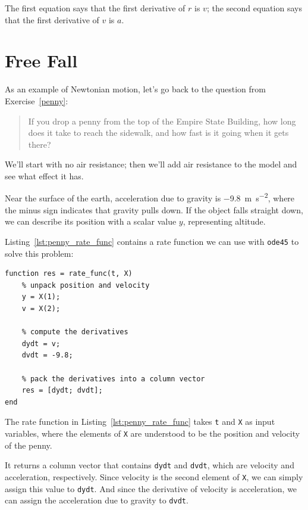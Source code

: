 The first equation says that the first derivative of $r$ is $v$;
the second equation says that the first derivative of $v$ is $a$.


\section{Free Fall}
\label{freefall}

As an example of Newtonian motion, let's go back to the question from Exercise~\ref{penny}:

\begin{quote}
If you drop a penny from the top of the Empire State Building, how long does it take to reach the sidewalk, and how fast is it going when it gets there?
\end{quote}

We'll start with no air resistance; then we'll add air resistance to the model and see what effect it has.


Near the surface of the earth,
acceleration due to gravity is \SI{-9.8}{\meter \per \second \squared}, where the minus sign
indicates that gravity pulls down.
If the object falls straight down, we can describe its position with a
scalar value $y$, representing altitude.

Listing~\ref{lst:penny_rate_func} contains a rate function we can use with \lstinline{ode45} to solve
this problem:

\begin{lstlisting}[caption={A rate function for the falling penny problem}, label={lst:penny_rate_func}]
function res = rate_func(t, X)
    % unpack position and velocity
    y = X(1);
    v = X(2);

    % compute the derivatives
    dydt = v;
    dvdt = -9.8;

    % pack the derivatives into a column vector
    res = [dydt; dvdt];
end
\end{lstlisting}

The rate function in Listing~\ref{lst:penny_rate_func} takes \lstinline{t} and \lstinline{X} as input variables, where the elements of \lstinline{X} are understood to be the position and velocity of the penny.

It returns a column vector that contains \lstinline{dydt} and \lstinline{dvdt}, which
are velocity and acceleration, respectively.
Since velocity is the second element of \lstinline{X}, we can simply assign this value to \lstinline{dydt}.
And since the derivative of velocity is acceleration, we can assign the acceleration due to gravity to \lstinline{dvdt}.

